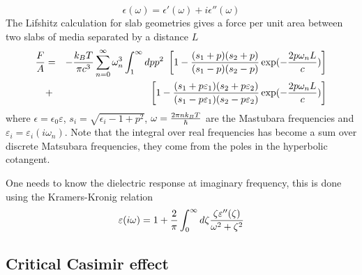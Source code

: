 \begin{equation}
\epsilon(\omega) = \epsilon'(\omega)+i\epsilon''(\omega)
\end{equation}
 The Lifshitz calculation for slab geometries gives a force per unit area between two slabs of media separated by a distance $L$
 \begin{eqnarray}
 {F\over A} &=& -{k_BT \over \pi c^3}\sum_{n=0}^\infty  \omega_n^3 \int_1^\infty dp p^2 \ 
 \left[ 1-{(s_1+p)(s_2+p)\over (s_1-p)(s_2-p)}\exp(-{2p\omega_n L\over c})\right]\nonumber \\
&+&\left[ 1-{(s_1+p\varepsilon_1)(s_2+p\varepsilon_2)\over (s_1-p\varepsilon_1)(s_2-p\varepsilon_2)}\exp(-{2p\omega_n L\over c})\right]
\end{eqnarray}
where $\epsilon = \epsilon_0\varepsilon$, $s_i = \sqrt{\epsilon_i -1 +p^2}$,
$\omega = {2\pi nk_BT \over \hbar}$ are the Mastubara frequencies and $\varepsilon_i
=\varepsilon_i(i\omega_n)$. Note that the integral over real frequencies has become a sum over discrete Matsubara frequencies, they come from the poles in the hyperbolic cotangent.

One needs to know the dielectric response at imaginary frequency, this is done using the Kramers-Kronig relation
\begin{equation}
\varepsilon(i\omega)= 1 +{2\over \pi}\int_0^\infty d\zeta {\zeta \varepsilon''(\zeta)\over \omega^2 + \zeta^2}
\end{equation}




\subsection{Critical Casimir effect}
